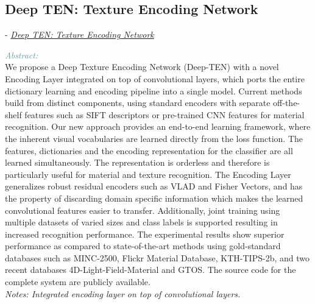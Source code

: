 \documentclass[]{article}
\newcommand{\paperentry}[4]{
            \hangindent=1cm
            \cite{#1} - \href{run:../References/#3}{\textcolor{Sepia}{\textit{#2}}}
            
            \noindent            
            \begin{minipage}[t]{0.1\linewidth}\hfill\end{minipage}
            \begin{minipage}[t]{0.8\linewidth}\textcolor{CadetBlue}{{\textit{Abstract:}}}\\#4\end{minipage}
            \vspace{.25cm}
          }
\begin{document}
				
			
\subsection{Deep TEN: Texture Encoding Network}							
			\paperentry{Zhang2016ten}
					{Deep TEN: Texture Encoding Network}
					{Existing Approaches to Texture Analysis/Deep TEN- Texture Encoding Network.pdf}
					{We propose a Deep Texture Encoding Network (Deep-TEN) with a novel Encoding Layer integrated on top of convolutional layers, which ports the entire dictionary learning and encoding pipeline into a single model. Current methods build from distinct components, using standard encoders with separate off-the-shelf features such as SIFT descriptors or pre-trained CNN features for material recognition. Our new approach provides an end-to-end learning framework, where the inherent visual vocabularies are learned directly from the loss function. The features, dictionaries and the encoding representation for the classifier are all learned simultaneously. The representation is orderless and therefore is particularly useful for material and texture recognition. The Encoding Layer generalizes robust residual encoders such as VLAD and Fisher Vectors, and has the property of discarding domain specific information which makes the learned convolutional features easier to transfer. Additionally, joint training using multiple datasets of varied sizes and class labels is supported resulting in increased recognition performance. The experimental results show superior performance as compared to state-of-the-art methods using gold-standard databases such as MINC-2500, Flickr Material Database, KTH-TIPS-2b, and two recent databases 4D-Light-Field-Material and GTOS. The source code for the complete system are publicly available.
							\\\emph{Notes: Integrated encoding layer on top of convolutional layers.}} \\ 
\pagebreak
\end{document}
